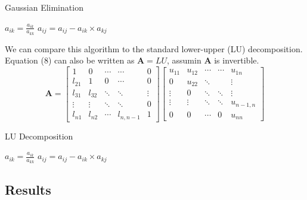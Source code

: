 \documentclass[11pt]{article}
\begin{document}
    \begin{algorithm}
    \caption{Gaussian Elimination}
    \label{Gaussian Elimination}
    \begin{algorithmic}[1]
    \State $a_{ik} = \frac{a_{ik}}{a_{kk}}$
    \State $a_{ij}=a_{ij}-a_{ik}\times a_{kj}$
    \EndFor
    \EndFor
    \EndFor
    \EndFunction
    \end{algorithmic}
    \end{algorithm}

    We can compare this algorithm to the standard lower-upper (LU) decomposition. Equation (8) can also be written as $\mathbf{A}=LU$, assumin $\mathbf{A}$ is invertible. 
    \begin{equation}
    \mathbf{A} = \left[ \begin{array}{ccccc} 1&0&\cdots &\cdots &0\\ l_{21} & 1 & 0 & \cdots & 0 \\ l_{31} & l_{32} & \ddots & \ddots & \vdots \\ \vdots &\vdots &\ddots & \ddots &0 \\ l_{n1} &l_{n2} &\cdots & l_{n,n-1}& 1 \end{array} \right] \left[ \begin{array}{ccccc} u_{11} & u_{12} &\cdots &\cdots &u_{1n} \\ 0&u_{22}&\ddots&&\vdots \\ \vdots&0&\ddots&\ddots&\vdots \\ \vdots&\vdots&\ddots&\ddots&u_{n-1,n} \\ 0&0&\cdots&0&u_{nn} \end{array} \right]
    \end{equation}

    \begin{algorithm}
    \caption{LU Decomposition}
    \label{LU Decomp}
    \begin{algorithmic}[1]
    \State $a_{ik} = \frac{a_{ik}}{a_{kk}}$
    \State $a_{ij}=a_{ij}-a_{ik}\times a_{kj}$
    \EndFor
    \EndFor
    \EndFor
    \EndFunction
    \end{algorithmic}
    \end{algorithm}


\subsection{Results}
\end{document}

